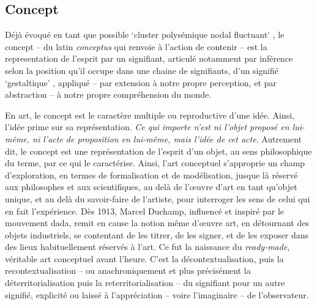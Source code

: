 \documentclass{article}
\newcommand{\footref}[1]{%
  \enotezwritemark{\enmarkstyle\ref{#1}}%
}
\begin{document}
\subsection{Concept} %

Déjà évoqué en tant que possible `cluster polysémique nodal fluctuant'%
, le concept -- du latin \textit{conceptus} qui renvoie à l'action de contenir -- est la representation de l'esprit par un signifiant, articulé notamment par inférence selon la position qu’il occupe dans une chaine de signifiants, d'un signifié `gestaltique'%
, appliqué -- par extension à notre propre perception, et par abstraction -- à notre propre compréhension du monde. 

En art, le concept est le caractère multiple ou reproductive d'une idée. Ainsi, l'idée prime sur sa représentation. \textit{Ce qui importe n’est ni l’objet proposé en lui-même, ni l’acte de proposition en lui-même, mais l’idée de cet acte}. Autrement dit, le concept est une représentation de l’esprit d’un objet, au sens philosophique du terme, par ce qui le caractérise.
Ainsi, l'art conceptuel s'approprie un champ d'exploration, en termes de formalisation et de modélisation, jusque là réservé aux philosophes et aux scientifiques, au delà de l'œuvre d'art en tant qu'objet unique, et au delà du savoir-faire de l'artiste, pour interroger les sens de celui qui en fait l'expérience.
Dès 1913, Marcel Duchamp, influencé et inspiré par le mouvement dada, remit en cause la notion même d'œuvre art, en détournant des objets industriels, se contentant de les titrer, de les signer, et de les exposer dans des lieux habituellement réservés à l'art. Ce fut la naissance du \textit{ready-made}, véritable art conceptuel avant l'heure. C'est la décontextualisation, puis la recontextualisation -- ou anachroniquement et plus précisément la déterritorialisation puis la reterritorialisation -- du signifiant pour un autre signifié, explicité ou laissé à l'appréciation -- voire l'imaginaire -- de l'observateur. 
\end{document}
